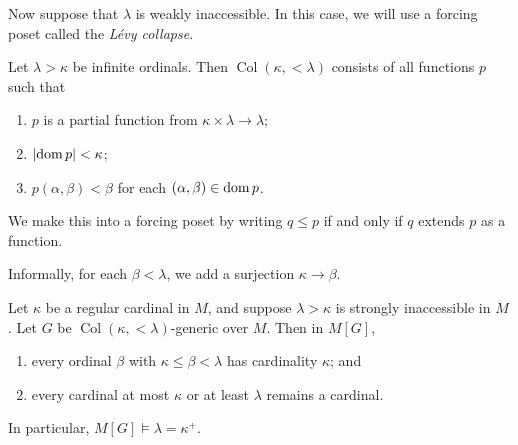Now suppose that \( \lambda \) is weakly inaccessible.
In this case, we will use a forcing poset called the \emph{L\'evy collapse}.
\begin{definition}
    Let \( \lambda > \kappa \) be infinite ordinals.
    Then \( \operatorname{Col}(\kappa,<\lambda) \) consists of all functions \( p \) such that
    \begin{enumerate}
        \item \( p \) is a partial function from \( \kappa \times \lambda \to \lambda \);
        \item \( \abs{\operatorname{dom} p} < \kappa \);
        \item \( p(\alpha, \beta) < \beta \) for each \( (\alpha, \beta) \in \operatorname{dom} p \).
    \end{enumerate}
    We make this into a forcing poset by writing \( q \leq p \) if and only if \( q \) extends \( p \) as a function.
\end{definition}
Informally, for each \( \beta < \lambda \), we add a surjection \( \kappa \to \beta \).
\begin{theorem}[L\'evy]
    Let \( \kappa \) be a regular cardinal in \( M \), and suppose \( \lambda > \kappa \) is strongly inaccessible in \( M \).
    Let \( G \) be \( \operatorname{Col}(\kappa, <\lambda) \)-generic over \( M \).
    Then in \( M[G] \),
    \begin{enumerate}
        \item every ordinal \( \beta \) with \( \kappa \leq \beta < \lambda \) has cardinality \( \kappa \); and
        \item every cardinal at most \( \kappa \) or at least \( \lambda \) remains a cardinal.
    \end{enumerate}
    In particular, \( M[G] \vDash \lambda = \kappa^+ \).
\end{theorem}
